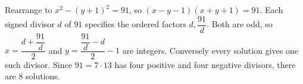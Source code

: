 Rearrange to $x^2-(y+1)^2=91$, so $(x-y-1)(x+y+1)=91$. Each signed divisor $d$ of $91$ specifies the ordered factors $d,\dfrac{91}{d}$. Both are odd, so $x=\dfrac{d+\dfrac{91}{d}}{2}$ and $y=\dfrac{\dfrac{91}{d}-d}{2}-1$ are integers. Conversely every solution gives one such divisor. Since $91=7\cdot13$ has four positive and four negative divisors, there are $\boxed8$ solutions.
